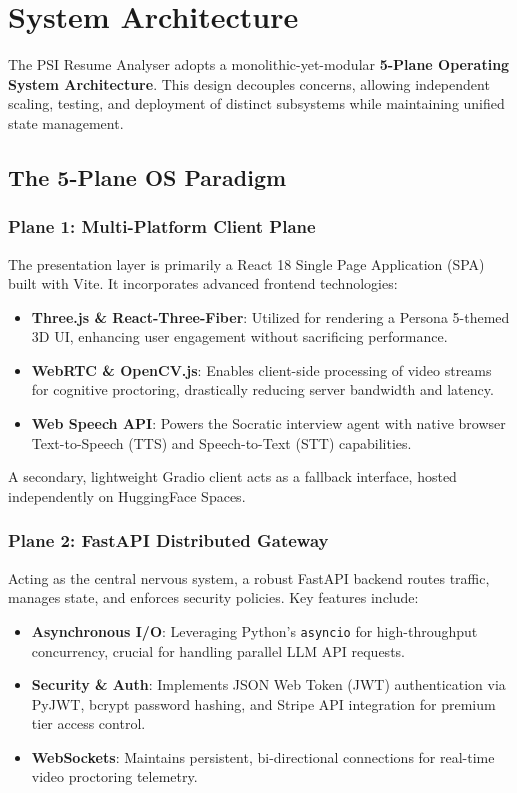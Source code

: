 \section{System Architecture}\label{sec:architecture}

The PSI Resume Analyser adopts a monolithic-yet-modular \textbf{5-Plane Operating System Architecture}. This design decouples concerns, allowing independent scaling, testing, and deployment of distinct subsystems while maintaining unified state management.

\subsection{The 5-Plane OS Paradigm}

\subsubsection{Plane 1: Multi-Platform Client Plane}
The presentation layer is primarily a React 18 Single Page Application (SPA) built with Vite. It incorporates advanced frontend technologies:
\begin{itemize}
    \item \textbf{Three.js \& React-Three-Fiber}: Utilized for rendering a Persona 5-themed 3D UI, enhancing user engagement without sacrificing performance.
    \item \textbf{WebRTC \& OpenCV.js}: Enables client-side processing of video streams for cognitive proctoring, drastically reducing server bandwidth and latency.
    \item \textbf{Web Speech API}: Powers the Socratic interview agent with native browser Text-to-Speech (TTS) and Speech-to-Text (STT) capabilities.
\end{itemize}
A secondary, lightweight Gradio client acts as a fallback interface, hosted independently on HuggingFace Spaces.

\subsubsection{Plane 2: FastAPI Distributed Gateway}
Acting as the central nervous system, a robust FastAPI backend routes traffic, manages state, and enforces security policies. Key features include:
\begin{itemize}
    \item \textbf{Asynchronous I/O}: Leveraging Python's \texttt{asyncio} for high-throughput concurrency, crucial for handling parallel LLM API requests.
    \item \textbf{Security \& Auth}: Implements JSON Web Token (JWT) authentication via PyJWT, bcrypt password hashing, and Stripe API integration for premium tier access control.
    \item \textbf{WebSockets}: Maintains persistent, bi-directional connections for real-time video proctoring telemetry.
\end{itemize}

